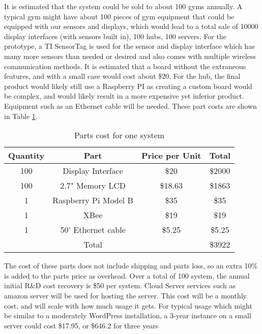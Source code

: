 \documentclass[PPFS.tex]{template/subfiles}
\begin{document}
        It is estimated that the system could be sold to about 100 gyms annually. A typical gym might have about 100 pieces of gym equipment that could be equipped with our sensors and displays, which would lead to a total sale of 10000 display interfaces (with sensors built in), 100 hubs, 100 servers. 
        For the prototype, a TI SensorTag is used for the sensor and display interface which has many more sensors than needed or desired and also comes with multiple wireless communication methods. It is estimated that a board without the extraneous features, and with a small case would cost about \$20.
        For the hub, the final product would likely still use a Raspberry PI as creating a custom board would be complex, and would likely result in a more expensive yet inferior product. Equipment such as an Ethernet cable will be needed.
        These part costs are shown in Table \ref{tab:prodPartsCost}.
        
        \begin{table}[H]
        	\begin{center}
        		\caption{Parts cost for one system}
        		\label{tab:prodPartsCost}
        		\begin{tabular}{|c|c|c|c|}
        			\hline
        			Quantity & Part & Price per Unit & Total\\
        			\hline
        			100 & Display Interface & \$20 & \$2000\\
        			\hline
        			100 & 2.7" Memory LCD & \$18.63 \cite{mouserMemoryLCD} & \$1863\\
        			\hline
        			1 & Raspberry Pi Model B & \$35 \cite{alliedRaspberryPi} & \$35\\
        			\hline
        			1 & XBee & \$19 \cite{mouserXBEE} & \$19\\
        			\hline
        			1 & 50' Ethernet cable & \$5.25 \cite{amazonEthernetCable} & \$5.25\\
        			\hline
        			&Total&& \$3922\\
        			\hline
        		\end{tabular}
        	\end{center}
        \end{table}
        
        The cost of these parts does not include shipping and parts loss, so an extra 10\% is added to the parts price as overhead. 
        Over a total of 100 system, the annual initial R\&D cost recovery is \$50 per system.
        Cloud Server services such as amazon server will be used for hosting the server. This cost will be a monthly cost, and will scale with how much usage it gets. For typical usage which might be similar to a moderately WordPress installation, a 3-year instance on a small server could cost \$17.95, or \$646.2 for three years \cite{wordPressEstimate}
        
\end{document}

